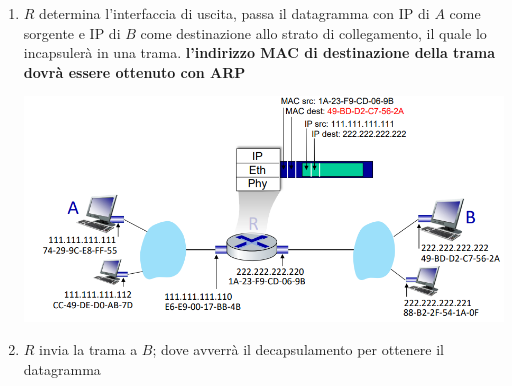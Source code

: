 \documentclass[12pt]{article}
\begin{document}
\begin{enumerate}
\begin{center}
    \end{center}
    \item $R$ determina l'interfaccia di uscita, passa il datagramma con IP di $A$ come sorgente e IP di $B$ come destinazione allo strato di collegamento, il quale lo incapsulerà in una trama. \textbf{l'indirizzo MAC di destinazione della trama dovrà essere ottenuto con ARP}
    \begin{center}
        \includegraphics[width =0.90\linewidth]{Images/134.png}
    \end{center}
    \item $R$ invia la trama a $B$; dove avverrà il decapsulamento per ottenere il datagramma
\end{enumerate}
\end{document}
